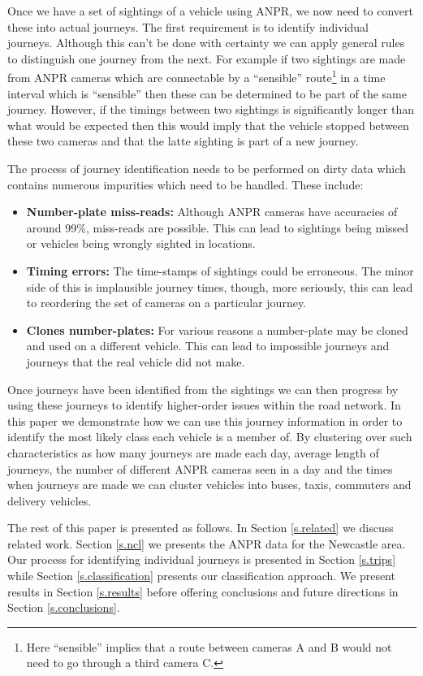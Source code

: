 Once we have a set of sightings of a vehicle using ANPR, we now need to convert these into actual journeys. The first requirement is to identify individual journeys. Although this can't be done with certainty we can apply general rules to distinguish one journey from the next. For example if two sightings are made from ANPR cameras which are connectable by a ``sensible'' route\footnote{Here ``sensible'' implies that a route between cameras A and B would not need to go through a third camera C.} in a time interval which is ``sensible'' then these can be determined to be part of the same journey. However, if the timings between two sightings is significantly longer than what would be expected then this would imply that the vehicle stopped between these two cameras and that the latte sighting is part of a new journey.

The process of journey identification needs to be performed on dirty data which contains numerous impurities which need to be handled. These include:

\begin{itemize}
	\item {\bf Number-plate miss-reads:} Although ANPR cameras have accuracies of around {\color{red}99\%}, miss-reads are possible. This can lead to sightings being missed or vehicles being wrongly sighted in locations.
	\item {\bf Timing errors:} The time-stamps of sightings could be erroneous. The minor side of this is implausible journey times, though, more seriously, this can lead to reordering the set of cameras on a particular journey.
	\item {\bf Clones number-plates:} For various reasons a number-plate may be cloned and used on a different vehicle. This can lead to impossible journeys and journeys that the real vehicle did not make.
\end{itemize}

Once journeys have been identified from the sightings we can then progress by using these journeys to identify higher-order issues within the road network. In this paper we demonstrate how we can use this journey information in order to identify the most likely class each vehicle is a member of. By clustering over such characteristics as how many journeys are made each day, average length of journeys, the number of different ANPR cameras seen in a day and the times when journeys are made we can cluster vehicles into buses, taxis, commuters and delivery vehicles. 

The rest of this paper is presented as follows. In Section \ref{s.related} we discuss related work. Section \ref{s.ncl} we presents the ANPR data for the Newcastle area. Our process for identifying individual journeys is presented in Section \ref{s.trips} while Section \ref{s.classification} presents our classification approach. We present results in Section \ref{s.results} before offering conclusions and future directions in Section \ref{s.conclusions}.

